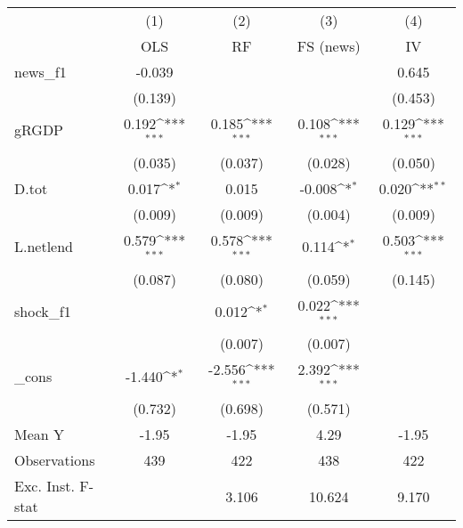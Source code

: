 {
\def\sym#1{\ifmmode^{#1}\else\(^{#1}\)\fi}
\begin{tabular}{l*{4}{c}}
\toprule
            &\multicolumn{1}{c}{(1)}&\multicolumn{1}{c}{(2)}&\multicolumn{1}{c}{(3)}&\multicolumn{1}{c}{(4)}\\
            &\multicolumn{1}{c}{OLS}&\multicolumn{1}{c}{RF}&\multicolumn{1}{c}{FS (news)}&\multicolumn{1}{c}{IV}\\
\midrule
news\_f1     &      -0.039         &                     &                     &       0.645         \\
            &     (0.139)         &                     &                     &     (0.453)         \\
\addlinespace
gRGDP       &       0.192\sym{***}&       0.185\sym{***}&       0.108\sym{***}&       0.129\sym{***}\\
            &     (0.035)         &     (0.037)         &     (0.028)         &     (0.050)         \\
\addlinespace
D.tot       &       0.017\sym{*}  &       0.015         &      -0.008\sym{*}  &       0.020\sym{**} \\
            &     (0.009)         &     (0.009)         &     (0.004)         &     (0.009)         \\
\addlinespace
L.netlend   &       0.579\sym{***}&       0.578\sym{***}&       0.114\sym{*}  &       0.503\sym{***}\\
            &     (0.087)         &     (0.080)         &     (0.059)         &     (0.145)         \\
\addlinespace
shock\_f1    &                     &       0.012\sym{*}  &       0.022\sym{***}&                     \\
            &                     &     (0.007)         &     (0.007)         &                     \\
\addlinespace
\_cons      &      -1.440\sym{*}  &      -2.556\sym{***}&       2.392\sym{***}&                     \\
            &     (0.732)         &     (0.698)         &     (0.571)         &                     \\
\midrule
Mean Y      &       -1.95         &       -1.95         &        4.29         &       -1.95         \\
Observations&         439         &         422         &         438         &         422         \\
Exc. Inst. F-stat&                     &       3.106         &      10.624         &       9.170         \\
\bottomrule
\end{tabular}
}
